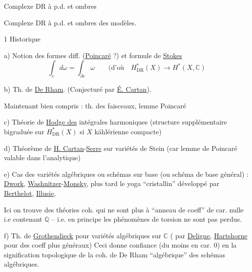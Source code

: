 Complexe DR à p.d. et ombres

Complexe DR à p.d. et ombres des modèles.


1 Historique

a) Notion des formes diff. (\uline{Poincaré} ?) et formule de \uline{Stokes}
\[
\int_c d\omega=\int_{\partial c}\omega
\qquad\text{(d'où}\quad H^{\ast}_{\mathrm{DR}}(X)\longrightarrow H^{\ast}(X,\mathbb C)
\]

b) Th. de \uline{De Rham}. (Conjecturé par \uline{É. Cartan}). 

Maintenant bien compris : th. des faisceaux, lemme Poincaré

c) Théorie de \uline{Hodge des} intégrales harmoniques (structure supplémentaire bigraduée sur $H^{\ast}_{\mathrm{DR}}(X)$ si $X$ kählérienne compacte)

d) Théorème de \uline{H. Cartan}-\uline{Serre} sur variétés de Stein (car lemme de Poincaré valable dans l'analytique)

e) Cas des variétés algébriques ou schémas sur  base (ou schéma de base général) : \uline{Dwork}, \uline{Washnitzer}-\uline{Monsky}, plus tard le yoga ``cristallin'' développé par \uline{Berthelot}, \uline{Illusie}, 

Ici on trouve des théories coh. qui ne sont plus à ``anneau de coeff''\unsure{\}} de car. nulle i.e contenant $\mathbb Q$ -- i.e. en principe les phénomènes de torsion ne sont pas perdus. 

f) Th. de \uline{Grothendieck} pour variétés algébriques sur $\mathbb C$ ( par \uline{Deligne}, \uline{Hartshorne} pour des coeff plus généraux) Ceci donne confiance (du moins en car. 0) en la signification topologique de la coh. de De Rham ``algébrique'' des schémas algébriques.

